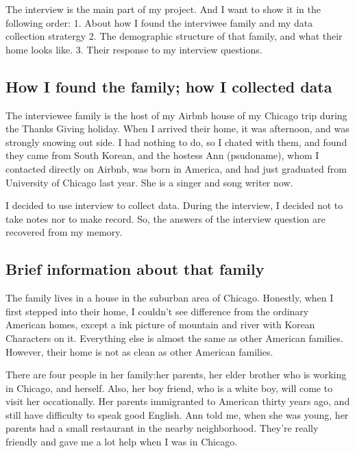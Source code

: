 The interview is the main part of my project. And I want to show it in the
following order: 1. About how I found the interviwee family and my data
collection stratergy 2. The demographic structure of that family, and what their
home looks like. 3. Their response to my interview questions.
\subsection{How I found the family; how I collected data}
The interviewee family is the host of my Airbnb house of my Chicago trip during
the Thanks Giving holiday. When I arrived their home, it was afternoon, and was
strongly snowing out side. I had nothing to do, so I chated with them, and found
they came from South Korean, and the hostess Ann (psudoname), whom I contacted
directly on Airbnb, was born in America, and had just graduated from 
University of Chicago last year. She is a singer and song writer now.
\par
I decided to use interview to collect data. During the interview, I decided not
to take notes nor to make record. So, the answers of the interview question are
recovered from my memory. 
\subsection{Brief information about that family}
The family lives in a house in the suburban area of Chicago. Honestly, when I
first stepped into their home, I couldn't see difference from the ordinary
American homes, except a ink picture of mountain and river with Korean
Characters on it. Everything else is almost the same as other American
families. However, their home is not as clean as other American families. 
\par
There are four people in her family:her parents, her elder brother who is
working in Chicago, and herself. Also, her boy friend, who is a white boy, will
come to visit her occationally. Her parents immigranted to American thirty years
ago, and still have difficulty to speak good English. Ann told
me, when she was young, her parents had a small restaurant in the nearby
neighborhood. They're really friendly and gave me a lot help when I was in
Chicago.

